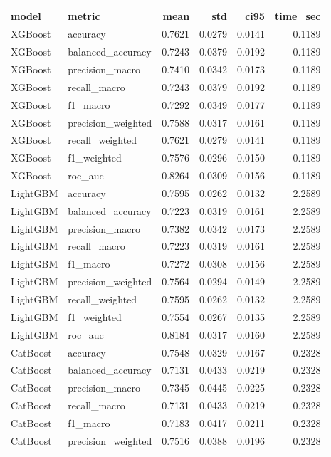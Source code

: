 \begin{tabular}{llrrrr}
\toprule
model & metric & mean & std & ci95 & time_sec \\
\midrule
XGBoost & accuracy & 0.7621 & 0.0279 & 0.0141 & 0.1189 \\
XGBoost & balanced_accuracy & 0.7243 & 0.0379 & 0.0192 & 0.1189 \\
XGBoost & precision_macro & 0.7410 & 0.0342 & 0.0173 & 0.1189 \\
XGBoost & recall_macro & 0.7243 & 0.0379 & 0.0192 & 0.1189 \\
XGBoost & f1_macro & 0.7292 & 0.0349 & 0.0177 & 0.1189 \\
XGBoost & precision_weighted & 0.7588 & 0.0317 & 0.0161 & 0.1189 \\
XGBoost & recall_weighted & 0.7621 & 0.0279 & 0.0141 & 0.1189 \\
XGBoost & f1_weighted & 0.7576 & 0.0296 & 0.0150 & 0.1189 \\
XGBoost & roc_auc & 0.8264 & 0.0309 & 0.0156 & 0.1189 \\
LightGBM & accuracy & 0.7595 & 0.0262 & 0.0132 & 2.2589 \\
LightGBM & balanced_accuracy & 0.7223 & 0.0319 & 0.0161 & 2.2589 \\
LightGBM & precision_macro & 0.7382 & 0.0342 & 0.0173 & 2.2589 \\
LightGBM & recall_macro & 0.7223 & 0.0319 & 0.0161 & 2.2589 \\
LightGBM & f1_macro & 0.7272 & 0.0308 & 0.0156 & 2.2589 \\
LightGBM & precision_weighted & 0.7564 & 0.0294 & 0.0149 & 2.2589 \\
LightGBM & recall_weighted & 0.7595 & 0.0262 & 0.0132 & 2.2589 \\
LightGBM & f1_weighted & 0.7554 & 0.0267 & 0.0135 & 2.2589 \\
LightGBM & roc_auc & 0.8184 & 0.0317 & 0.0160 & 2.2589 \\
CatBoost & accuracy & 0.7548 & 0.0329 & 0.0167 & 0.2328 \\
CatBoost & balanced_accuracy & 0.7131 & 0.0433 & 0.0219 & 0.2328 \\
CatBoost & precision_macro & 0.7345 & 0.0445 & 0.0225 & 0.2328 \\
CatBoost & recall_macro & 0.7131 & 0.0433 & 0.0219 & 0.2328 \\
CatBoost & f1_macro & 0.7183 & 0.0417 & 0.0211 & 0.2328 \\
CatBoost & precision_weighted & 0.7516 & 0.0388 & 0.0196 & 0.2328 \\

\end{tabular}

